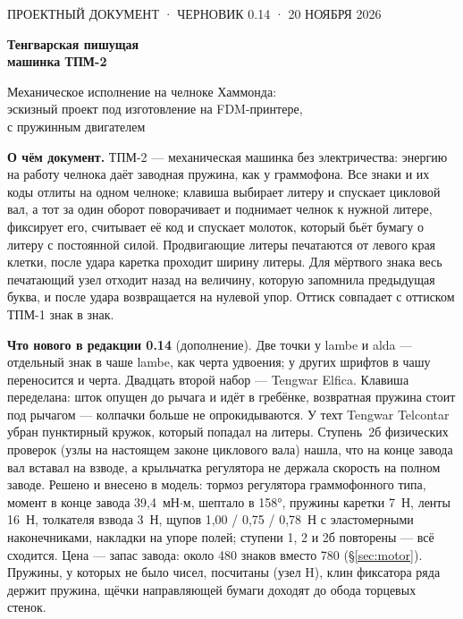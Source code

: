 


\begin{titlepage}
\vspace*{6mm}
{\sffamily\small ПРОЕКТНЫЙ ДОКУМЕНТ · ЧЕРНОВИК 0.14 · 20 НОЯБРЯ 2026}\par
\vspace{8mm}
{\sffamily\bfseries\fontsize{26}{30}\selectfont Тенгварская пишущая\\[2pt] машинка ТПМ-2}\par
\vspace{4mm}
{\large Механическое исполнение на челноке Хаммонда:\\ эскизный проект под изготовление на FDM-принтере,\\ с пружинным двигателем}\par
\vspace{8mm}
\begin{center}
\setlength\tgem{11mm}
\begin{tikzpicture}[x=\tgu,y=\tgu]

\end{tikzpicture}
\end{center}
\vspace{6mm}
\noindent\begin{minipage}{0.86\textwidth}\small
\textbf{О чём документ.} ТПМ-2 — механическая машинка без электричества: энергию на работу челнока даёт заводная пружина, как у граммофона. Все знаки и их коды отлиты на одном челноке; клавиша выбирает литеру и спускает цикловой вал, а тот за один оборот поворачивает и поднимает челнок к нужной литере, фиксирует его, считывает её код и спускает молоток, который бьёт бумагу о литеру с постоянной силой. Продвигающие литеры печатаются от левого края клетки, после удара каретка проходит ширину литеры. Для мёртвого знака весь печатающий узел отходит назад на величину, которую запомнила предыдущая буква, и после удара возвращается на нулевой упор. Оттиск совпадает с оттиском ТПМ-1 знак в знак.

\textbf{Что нового в редакции 0.14} (дополнение). Две точки у lambe и alda — отдельный знак в чаше lambe, как черта удвоения; у других шрифтов в чашу переносится и черта. Двадцать второй набор — Tengwar Elfica. Клавиша переделана: шток опущен до рычага и идёт в гребёнке, возвратная пружина стоит под рычагом — колпачки больше не опрокидываются. У техт Tengwar Telcontar убран пунктирный кружок, который попадал на литеры. Ступень~2б физических проверок (узлы на настоящем законе циклового вала) нашла, что на конце завода вал вставал на взводе, а крыльчатка регулятора не держала скорость на полном заводе. Решено и внесено в модель: тормоз регулятора граммофонного типа, момент в конце завода 39,4~мН$\cdot$м, шептало в 158°, пружины каретки 7~Н, ленты 16~Н, толкателя взвода 3~Н, щупов 1,00 / 0,75 / 0,78~Н с эластомерными наконечниками, накладки на упоре полей; ступени 1, 2 и 2б повторены — всё сходится. Цена — запас завода: около 480 знаков вместо 780 (\S\ref{sec:motor}). Пружины, у которых не было чисел, посчитаны (узел H), клин фиксатора ряда держит пружина, щёчки направляющей бумаги доходят до обода торцевых стенок.


\end{minipage}
\end{titlepage}
